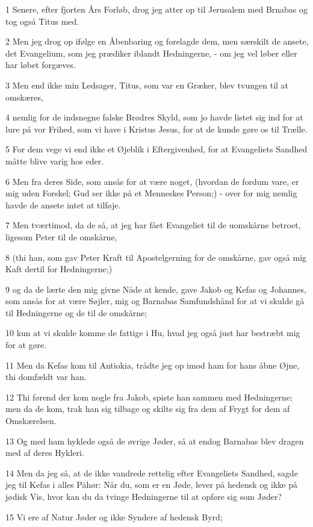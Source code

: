 \par 1 Senere, efter fjorten Års Forløb, drog jeg atter op til Jerusalem med Brnabas og tog også Titus med.
\par 2 Men jeg drog op ifølge en Åbenbaring og forelagde dem, men særskilt de ansete, det Evangelium, som jeg prædiker iblandt Hedningerne, - om jeg vel løber eller har løbet forgæves.
\par 3 Men end ikke min Ledsager, Titus, som var en Græker, blev tvungen til at omskæres,
\par 4 nemlig for de indsnegne falske Brødres Skyld, som jo havde listet sig ind for at lure på vor Frihed, som vi have i Kristus Jesus, for at de kunde gøre os til Trælle.
\par 5 For dem vege vi end ikke et Øjeblik i Eftergivenhed, for at Evangeliets Sandhed måtte blive varig hos eder.
\par 6 Men fra deres Side, som ansås for at være noget, (hvordan de fordum vare, er mig uden Forskel; Gud ser ikke på et Menneskes Person;) - over for mig nemlig havde de ansete intet at tilføje.
\par 7 Men tværtimod, da de så, at jeg har fået Evangeliet til de uomskårne betroet, ligesom Peter til de omskårne,
\par 8 (thi han, som gav Peter Kraft til Apostelgerning for de omskårne, gav også mig Kaft dertil for Hedningerne;)
\par 9 og da de lærte den mig givne Nåde at kende, gave Jakob og Kefas og Johannes, som ansås for at være Søjler, mig og Barnabas Samfundshånd for at vi skulde gå til Hedningerne og de til de omskårne;
\par 10 kun at vi skulde komme de fattige i Hu, hvad jeg også just har bestræbt mig for at gøre.
\par 11 Men da Kefas kom til Antiokia, trådte jeg op imod ham for hans åbne Øjne, thi domfældt var han.
\par 12 Thi førend der kom nogle fra Jakob, spiste han sammen med Hedningerne; men da de kom, trak han sig tilbage og skilte sig fra dem af Frygt for dem af Omskærelsen.
\par 13 Og med ham hyklede også de øvrige Jøder, så at endog Barnabas blev dragen med af deres Hykleri.
\par 14 Men da jeg så, at de ikke vandrede rettelig efter Evangeliets Sandhed, sagde jeg til Kefas i alles Påhør: Når du, som er en Jøde, lever på hedensk og ikke på jødisk Vis, hvor kan du da tvinge Hedningerne til at opføre sig som Jøder?
\par 15 Vi ere af Natur Jøder og ikke Syndere af hedensk Byrd;
